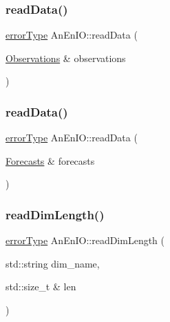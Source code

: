 \subsubsection{\texorpdfstring{read\+Data()}{readData()}\hspace{0.1cm}{\footnotesize\ttfamily [1/2]}}
{\footnotesize\ttfamily \mbox{\hyperlink{class_an_en_i_o_aa56bc1ec6610b86db4349bce20f9ead0}{error\+Type}} An\+En\+I\+O\+::read\+Data (\begin{DoxyParamCaption}\item[{\mbox{\hyperlink{class_observations}{Observations}} \&}]{observations }\end{DoxyParamCaption})}

\mbox{\label{class_an_en_i_o_aa00d954aadc03593981748c572010ffd}} 
\subsubsection{\texorpdfstring{read\+Data()}{readData()}\hspace{0.1cm}{\footnotesize\ttfamily [2/2]}}
{\footnotesize\ttfamily \mbox{\hyperlink{class_an_en_i_o_aa56bc1ec6610b86db4349bce20f9ead0}{error\+Type}} An\+En\+I\+O\+::read\+Data (\begin{DoxyParamCaption}\item[{\mbox{\hyperlink{class_forecasts}{Forecasts}} \&}]{forecasts }\end{DoxyParamCaption})}

\mbox{\label{class_an_en_i_o_a5ca1c7df3da9720967d7ed06f2dfe09b}} 
\subsubsection{\texorpdfstring{read\+Dim\+Length()}{readDimLength()}}
{\footnotesize\ttfamily \mbox{\hyperlink{class_an_en_i_o_aa56bc1ec6610b86db4349bce20f9ead0}{error\+Type}} An\+En\+I\+O\+::read\+Dim\+Length (\begin{DoxyParamCaption}\item[{std\+::string}]{dim\+\_\+name,  }\item[{std\+::size\+\_\+t \&}]{len }\end{DoxyParamCaption})}

